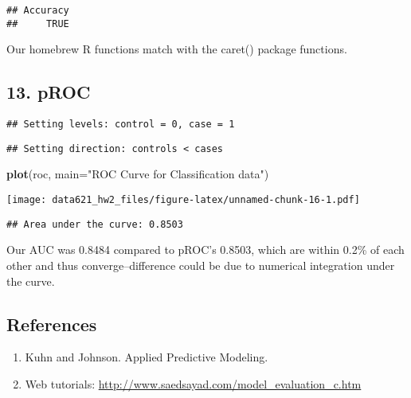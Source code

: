 \documentclass[
]{article}
\newenvironment{Shaded}{\begin{snugshade}}{\end{snugshade}}
\newcommand{\CommentTok}[1]{\textcolor[rgb]{0.56,0.35,0.01}{\textit{#1}}}
\newcommand{\DataTypeTok}[1]{\textcolor[rgb]{0.13,0.29,0.53}{#1}}
\newcommand{\KeywordTok}[1]{\textcolor[rgb]{0.13,0.29,0.53}{\textbf{#1}}}
\newcommand{\NormalTok}[1]{#1}
\newcommand{\OperatorTok}[1]{\textcolor[rgb]{0.81,0.36,0.00}{\textbf{#1}}}
\newcommand{\StringTok}[1]{\textcolor[rgb]{0.31,0.60,0.02}{#1}}
\providecommand{\tightlist}{%
  \setlength{\itemsep}{0pt}\setlength{\parskip}{0pt}}
\begin{document}
\begin{verbatim}
## Accuracy 
##     TRUE
\end{verbatim}

Our homebrew R functions match with the caret() package functions.

\hypertarget{proc}{%
\subsection{13. pROC}\label{proc}}

\begin{Shaded}
\end{Shaded}

\begin{verbatim}
## Setting levels: control = 0, case = 1
\end{verbatim}

\begin{verbatim}
## Setting direction: controls < cases
\end{verbatim}

\begin{Shaded}
\begin{Highlighting}[]
\KeywordTok{plot}\NormalTok{(roc, }\DataTypeTok{main=}\StringTok{"ROC Curve for Classification data"}\NormalTok{) }
\end{Highlighting}
\end{Shaded}

\texttt{[image: data621\_hw2\_files/figure-latex/unnamed-chunk-16-1.pdf]}

\begin{Shaded}
\end{Shaded}

\begin{verbatim}
## Area under the curve: 0.8503
\end{verbatim}

Our AUC was 0.8484 compared to pROC's 0.8503, which are within 0.2\% of
each other and thus converge--difference could be due to numerical
integration under the curve.

\hypertarget{references}{%
\subsection{References}\label{references}}

\begin{enumerate}
\def\labelenumi{\arabic{enumi}.}
\tightlist
\item
  Kuhn and Johnson. Applied Predictive Modeling.
\item
  Web tutorials: \url{http://www.saedsayad.com/model_evaluation_c.htm}
\end{enumerate}
\end{document}
